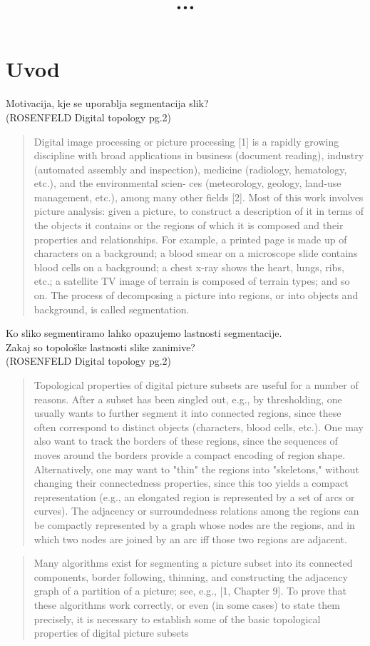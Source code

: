 \documentclass[mat1, tisk]{fmfdelo}
\title{...}
\begin{document}
\section{Uvod}
Motivacija, kje se uporablja segmentacija slik?\\
(ROSENFELD Digital topology pg.2) 
\begin{quote}
  
  Digital image processing or picture processing [1] is a rapidly growing discipline with broad applications in business (document reading), industry (automated assembly and inspection), medicine (radiology, hematology, etc.), and the environmental scien- ces (meteorology, geology, land-use management, etc.), among many other fields [2]. Most of this work involves picture analysis: given a picture, to construct a description of it in terms of the objects it contains or the regions of which it is composed and their properties and relationships. For example, a printed page is made up of characters on a background; a blood smear on a microscope slide contains blood cells on a background; a chest x-ray shows the heart, lungs, ribs, etc.; a satellite TV image of terrain is composed of terrain types; and so on. The process of decomposing a picture into regions, or into objects and background, is called segmentation.
\end{quote}
Ko sliko segmentiramo lahko opazujemo lastnosti segmentacije.\\
Zakaj so topološke lastnosti slike zanimive?\\
(ROSENFELD Digital topology pg.2) 
\begin{quote}
  Topological properties of digital picture subsets are useful for a number of reasons. After a subset has been singled out, e.g., by thresholding, one usually wants to further segment it into connected regions, since these often correspond to distinct objects (characters, blood cells, etc.). One may also want to track the borders of these regions, since the sequences of moves around the borders provide a compact encoding of region shape. Alternatively, one may want to "thin" the regions into "skeletons," without changing their connectedness properties, since this too yields a compact representation (e.g., an elongated region is represented by a set of arcs or curves). The adjacency or surroundedness relations among the regions can be compactly represented by a graph whose nodes are the regions, and in which two nodes are joined by an arc iff those two regions are adjacent.
\end{quote}
\begin{quote}
  Many algorithms exist for segmenting a picture subset into its connected components, border following, thinning, and constructing the adjacency graph of a partition of a picture; see, e.g., [1, Chapter 9]. To prove that these algorithms work correctly, or even (in some cases) to state them precisely, it is necessary to establish some of the basic topological properties of digital picture subsets
\end{quote}
\end{document}
